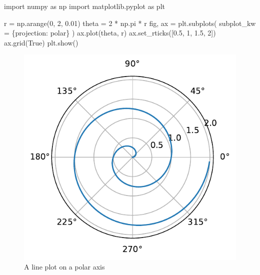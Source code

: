 \documentclass[
  letterpaper,
  DIV=11,
  numbers=noendperiod]{scrartcl}
\newenvironment{Shaded}{\begin{snugshade}}{\end{snugshade}}
\newcommand{\DecValTok}[1]{\textcolor[rgb]{0.68,0.00,0.00}{#1}}
\newcommand{\FloatTok}[1]{\textcolor[rgb]{0.68,0.00,0.00}{#1}}
\newcommand{\ImportTok}[1]{\textcolor[rgb]{0.00,0.46,0.62}{#1}}
\newcommand{\NormalTok}[1]{\textcolor[rgb]{0.00,0.23,0.31}{#1}}
\newcommand{\OperatorTok}[1]{\textcolor[rgb]{0.37,0.37,0.37}{#1}}
\newcommand{\StringTok}[1]{\textcolor[rgb]{0.13,0.47,0.30}{#1}}
\newcommand{\VariableTok}[1]{\textcolor[rgb]{0.07,0.07,0.07}{#1}}
\theoremstyle{plain}
\theoremstyle{plain}
\theoremstyle{plain}
\theoremstyle{definition}
\theoremstyle{remark}
\begin{document}
\begin{Shaded}
\begin{Highlighting}[]
\ImportTok{import}\NormalTok{ numpy }\ImportTok{as}\NormalTok{ np}
\ImportTok{import}\NormalTok{ matplotlib.pyplot }\ImportTok{as}\NormalTok{ plt}

\NormalTok{r }\OperatorTok{=}\NormalTok{ np.arange(}\DecValTok{0}\NormalTok{, }\DecValTok{2}\NormalTok{, }\FloatTok{0.01}\NormalTok{)}
\NormalTok{theta }\OperatorTok{=} \DecValTok{2} \OperatorTok{*}\NormalTok{ np.pi }\OperatorTok{*}\NormalTok{ r}
\NormalTok{fig, ax }\OperatorTok{=}\NormalTok{ plt.subplots(}
\NormalTok{  subplot\_kw }\OperatorTok{=}\NormalTok{ \{}\StringTok{\textquotesingle{}projection\textquotesingle{}}\NormalTok{: }\StringTok{\textquotesingle{}polar\textquotesingle{}}\NormalTok{\} }
\NormalTok{)}
\NormalTok{ax.plot(theta, r)}
\NormalTok{ax.set\_rticks([}\FloatTok{0.5}\NormalTok{, }\DecValTok{1}\NormalTok{, }\FloatTok{1.5}\NormalTok{, }\DecValTok{2}\NormalTok{])}
\NormalTok{ax.grid(}\VariableTok{True}\NormalTok{)}
\NormalTok{plt.show()}
\end{Highlighting}
\end{Shaded}

\begin{figure}[H]

{\centering \includegraphics{index_files/figure-pdf/fig-polar-output-1.pdf}

}

\caption{\label{fig-polar}A line plot on a polar axis}

\end{figure}
\end{document}
